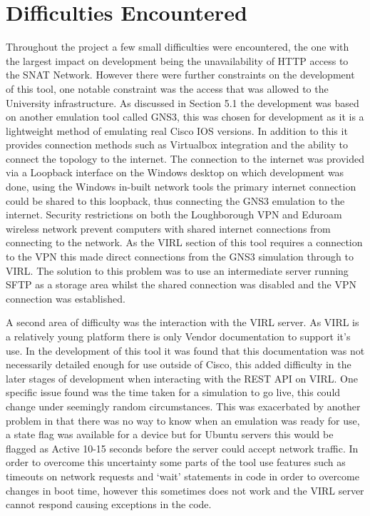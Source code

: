 \documentclass[11pt]{report}
\begin{document}
\section{Difficulties Encountered}

Throughout the project a few small difficulties were encountered, the one with the largest impact on development being the unavailability of HTTP access to the SNAT Network. However there were further constraints on the development of this tool, one notable constraint was the access that was allowed to the University infrastructure. As discussed in Section 5.1 the development was based on another emulation tool called GNS3, this was chosen for development as it is a lightweight method of emulating real Cisco IOS versions. In addition to this it provides connection methods such as Virtualbox integration and the ability to connect the topology to the internet. The connection to the internet was provided via a Loopback interface on the Windows desktop on which development was done, using the Windows in-built network tools the primary internet connection could be shared to this loopback, thus connecting the GNS3 emulation to the internet. Security restrictions on both the Loughborough VPN and Eduroam wireless network prevent computers with shared internet connections from connecting to the network. As the VIRL section of this tool requires a connection to the VPN this made direct connections from the GNS3 simulation through to VIRL. The solution to this problem was to use an intermediate server running SFTP as a storage area whilst the shared connection was disabled and the VPN connection was established.

A second area of difficulty was the interaction with the VIRL server. As VIRL is a relatively young platform there is only Vendor documentation to support it's use. In the development of this tool it was found that this documentation was not necessarily detailed enough for use outside of Cisco, this added difficulty in the later stages of development when interacting with the REST API on VIRL. One specific issue found was the time taken for a simulation to go live, this could change under seemingly random circumstances. This was exacerbated by another problem in that there was no way to know when an emulation was ready for use, a state flag was available for a device but for Ubuntu servers this would be flagged as Active 10-15 seconds before the server could accept network traffic. In order to overcome this uncertainty some parts of the tool use features such as timeouts on network requests and `wait' statements in code in order to overcome changes in boot time, however this sometimes does not work and the VIRL server cannot respond causing exceptions in the code.
\end{document}
